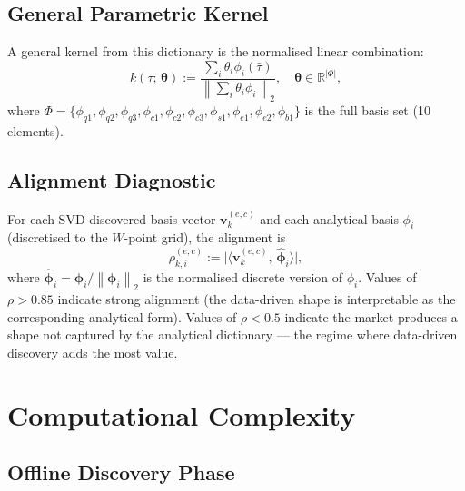 \documentclass[11pt,a4paper]{article}
\theoremstyle{definition}
\theoremstyle{plain}
\newcommand{\R}{\mathbb{R}}
\newcommand{\bvec}[1]{\mathbf{#1}}
\newcommand{\norm}[1]{\left\lVert #1 \right\rVert}
\newcommand{\inner}[2]{\langle #1,\, #2 \rangle}
\begin{document}
\subsection{General Parametric Kernel}

A general kernel from this dictionary is the normalised linear combination:
\begin{equation}
    k(\bar{\tau};\, \boldsymbol{\theta}) :=
    \frac{\displaystyle\sum_{i} \theta_i \phi_i(\bar{\tau})}
         {\displaystyle\left\|\sum_{i} \theta_i \phi_i\right\|_2},
    \quad \boldsymbol{\theta} \in \R^{|\Phi|},
    \label{eq:analytical_kernel}
\end{equation}
where $\Phi = \{\phi_{q1}, \phi_{q2}, \phi_{q3}, \phi_{c1}, \phi_{c2}, \phi_{c3},
\phi_{s1}, \phi_{e1}, \phi_{e2}, \phi_{b1}\}$ is the full basis set (10 elements).

\subsection{Alignment Diagnostic}

For each SVD-discovered basis vector $\bvec{v}^{(e,c)}_k$ and each analytical basis
$\phi_i$ (discretised to the $W$-point grid), the alignment is
\begin{equation}
    \rho_{k,i}^{(e,c)} :=
    \bigl|\inner{\bvec{v}^{(e,c)}_k}{\hat{\boldsymbol{\phi}}_i}\bigr|,
    \label{eq:alignment}
\end{equation}
where $\hat{\boldsymbol{\phi}}_i = \boldsymbol{\phi}_i / \norm{\boldsymbol{\phi}_i}_2$
is the normalised discrete version of $\phi_i$. Values of $\rho > 0.85$ indicate strong
alignment (the data-driven shape is interpretable as the corresponding analytical form).
Values of $\rho < 0.5$ indicate the market produces a shape not captured by the
analytical dictionary --- the regime where data-driven discovery adds the most value.

\section{Computational Complexity}
\label{sec:complexity}

\subsection{Offline Discovery Phase}
\end{document}
